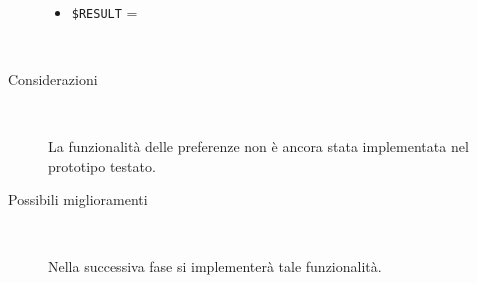 \documentclass[../../SperimentazioniPratiche.tex]{subfiles}
\begin{document}
\begin{tcolorbox}[fonttitle=\bfseries, 
								adjusted title={\Large Prova 2B.1}, 
								breakable, 
								sharp corners=south,
								colback=white, 
								colframe=white!60!black]
\begin{description}[leftmargin=0.7cm,labelwidth=!]
\begin{description}
        					\item[\dispositivoB] \ \par
        					\begin{itemize}
        						\item \verb|$RESULT| = \ns
        					\end{itemize}
        					
        				\end{description}
        				
        			\tcbline
        			
        			\item[Analisi risultati] \ \par
        				\begin{description}
        					\item[Considerazioni] \ \par
        						La funzionalità delle preferenze non è ancora stata implementata nel prototipo testato.
        					
        					\item[Possibili miglioramenti] \ \par 
        						Nella successiva fase si implementerà tale funzionalità.
        				\end{description}
        				
				\end{description}  
				
			\end{tcolorbox}



	
	\newpage
\end{document}
